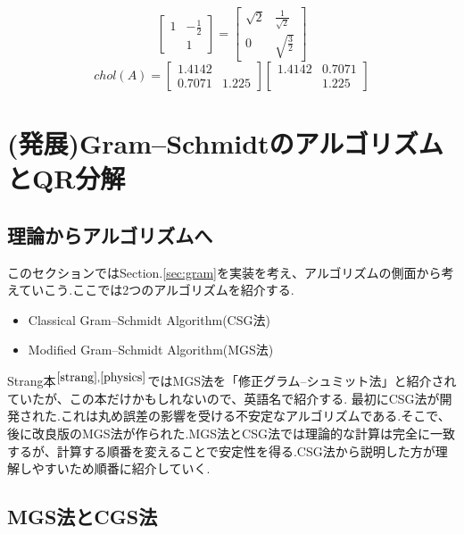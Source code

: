 \begin{framed}
\[\begin{bmatrix}1 & -\frac{1}{2} \\ & 1\end{bmatrix}
=
\begin{bmatrix}\sqrt{2} & \frac{1}{\sqrt{2}} \\ 0 & \sqrt{\frac{3}{2}}\end{bmatrix}
\]
\[
chol(A)=
\begin{bmatrix}1.4142 &  \\ 0.7071 & 1.225\end{bmatrix}
\begin{bmatrix}1.4142 & 0.7071 \\ & 1.225\end{bmatrix}
\]
\end{framed}
\section{(発展)Gram--SchmidtのアルゴリズムとQR分解}\label{sec:GS_ALG}
\subsection{理論からアルゴリズムへ}
このセクションではSection.\ref{sec:gram}を実装を考え、アルゴリズムの側面から考えていこう.ここでは2つのアルゴリズムを紹介する.
\begin{itemize}
    \item Classical Gram--Schmidt Algorithm(CSG法)
    \item Modified Gram--Schmidt Algorithm(MGS法)
\end{itemize}
Strang本$^{\cite{strang},\cite{physics}}$ではMGS法を「修正グラム--シュミット法」と紹介されていたが、この本だけかもしれないので、英語名で紹介する.
最初にCSG法が開発された.これは丸め誤差の影響を受ける不安定なアルゴリズムである.そこで、後に改良版のMGS法が作られた.MGS法とCSG法では理論的な計算は完全に一致するが、計算する順番を変えることで安定性を得る.CSG法から説明した方が理解しやすいため順番に紹介していく.

\subsection{MGS法とCGS法}
